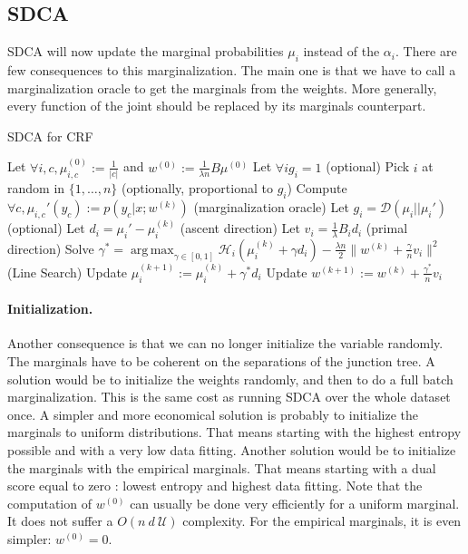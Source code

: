 \documentclass{article}
\DeclareMathOperator{\1}{\mathbb{1}}
\DeclareMathOperator*{\argmax}{arg\,max}
\begin{document}
\subsection{SDCA}
SDCA will now update the marginal probabilities $\mu_i$ instead of the $\alpha_i$. 
There are few consequences to this marginalization.
The main one is that we have to call a marginalization oracle to get the marginals from the weights.
More generally, every function of the joint should be replaced by its marginals counterpart. 

\begin{algorithm}[ht]
    \caption{SDCA for CRF}%
    \label{sdca for crf}
\begin{algorithmic}
        \STATE Let $\forall i, c, \mu_{i, c}^{(0)} := \frac{1}{|c|}$ and $w^{(0)} := \frac{1}{\lambda n} B \mu^{(0)} $
        \STATE Let $\forall i g_i = 1$ (optional)
                \STATE Pick $i$ at random in $\{1,\ldots,n\}$ (optionally, proportional to $g_i$)
                \STATE Compute $\forall c, \mu_{i, c}' (y_c) := p(y_c|x; w^{(k)})$ (marginalization oracle)
                \STATE Let $g_i = \mathcal D(\mu_i || \mu_i')$ (optional)
                \STATE Let $d_i = \mu_i' - \mu_i^{(k)}$ (ascent direction)
                \STATE Let $v_i = \frac{1}{\lambda} B_i d_i $ (primal direction)
                \STATE Solve $\gamma^* = \argmax_{\gamma \in [0,1]} \mathcal H_i(\mu_i^{(k)} + \gamma d_i) - \frac{\lambda n}{2} \| w^{(k)} + \frac{\gamma}{n} v_i \|^2$ (Line Search)
               \STATE Update $\mu_i^{(k+1)} := \mu_i^{(k)} + \gamma^* d_i$
               \STATE Update $w^{(k+1)} := w^{(k)} + \frac{\gamma^*}{n} v_i $
        \ENDFOR
\end{algorithmic}
\end{algorithm}

\paragraph{Initialization.}
Another consequence is that we can no longer initialize the variable randomly. 
The marginals have to be coherent on the separations of the junction tree.
A solution would be to initialize the weights randomly, and then to do a full batch marginalization.
This is the same cost as running SDCA over the whole dataset once.
A simpler and more economical solution is probably to initialize the marginals to uniform distributions.
That means starting with the highest entropy possible and with a very low data fitting.
Another solution would be to initialize the marginals with the empirical marginals.
That means starting with a dual score equal to zero : lowest entropy and highest data fitting.
Note that the computation of $w^{(0)}$ can usually be done very efficiently for a uniform marginal.
It does not suffer a $O(n\ d\ \mathcal U)$ complexity.
For the empirical marginals, it is even simpler: $w^{(0)}=0$.
\end{document}
